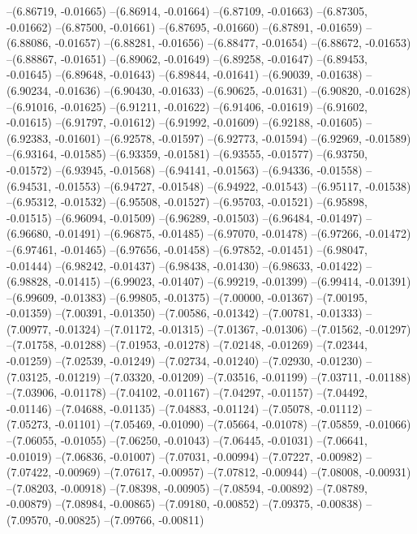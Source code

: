--(6.86719, -0.01665)
--(6.86914, -0.01664)
--(6.87109, -0.01663)
--(6.87305, -0.01662)
--(6.87500, -0.01661)
--(6.87695, -0.01660)
--(6.87891, -0.01659)
--(6.88086, -0.01657)
--(6.88281, -0.01656)
--(6.88477, -0.01654)
--(6.88672, -0.01653)
--(6.88867, -0.01651)
--(6.89062, -0.01649)
--(6.89258, -0.01647)
--(6.89453, -0.01645)
--(6.89648, -0.01643)
--(6.89844, -0.01641)
--(6.90039, -0.01638)
--(6.90234, -0.01636)
--(6.90430, -0.01633)
--(6.90625, -0.01631)
--(6.90820, -0.01628)
--(6.91016, -0.01625)
--(6.91211, -0.01622)
--(6.91406, -0.01619)
--(6.91602, -0.01615)
--(6.91797, -0.01612)
--(6.91992, -0.01609)
--(6.92188, -0.01605)
--(6.92383, -0.01601)
--(6.92578, -0.01597)
--(6.92773, -0.01594)
--(6.92969, -0.01589)
--(6.93164, -0.01585)
--(6.93359, -0.01581)
--(6.93555, -0.01577)
--(6.93750, -0.01572)
--(6.93945, -0.01568)
--(6.94141, -0.01563)
--(6.94336, -0.01558)
--(6.94531, -0.01553)
--(6.94727, -0.01548)
--(6.94922, -0.01543)
--(6.95117, -0.01538)
--(6.95312, -0.01532)
--(6.95508, -0.01527)
--(6.95703, -0.01521)
--(6.95898, -0.01515)
--(6.96094, -0.01509)
--(6.96289, -0.01503)
--(6.96484, -0.01497)
--(6.96680, -0.01491)
--(6.96875, -0.01485)
--(6.97070, -0.01478)
--(6.97266, -0.01472)
--(6.97461, -0.01465)
--(6.97656, -0.01458)
--(6.97852, -0.01451)
--(6.98047, -0.01444)
--(6.98242, -0.01437)
--(6.98438, -0.01430)
--(6.98633, -0.01422)
--(6.98828, -0.01415)
--(6.99023, -0.01407)
--(6.99219, -0.01399)
--(6.99414, -0.01391)
--(6.99609, -0.01383)
--(6.99805, -0.01375)
--(7.00000, -0.01367)
--(7.00195, -0.01359)
--(7.00391, -0.01350)
--(7.00586, -0.01342)
--(7.00781, -0.01333)
--(7.00977, -0.01324)
--(7.01172, -0.01315)
--(7.01367, -0.01306)
--(7.01562, -0.01297)
--(7.01758, -0.01288)
--(7.01953, -0.01278)
--(7.02148, -0.01269)
--(7.02344, -0.01259)
--(7.02539, -0.01249)
--(7.02734, -0.01240)
--(7.02930, -0.01230)
--(7.03125, -0.01219)
--(7.03320, -0.01209)
--(7.03516, -0.01199)
--(7.03711, -0.01188)
--(7.03906, -0.01178)
--(7.04102, -0.01167)
--(7.04297, -0.01157)
--(7.04492, -0.01146)
--(7.04688, -0.01135)
--(7.04883, -0.01124)
--(7.05078, -0.01112)
--(7.05273, -0.01101)
--(7.05469, -0.01090)
--(7.05664, -0.01078)
--(7.05859, -0.01066)
--(7.06055, -0.01055)
--(7.06250, -0.01043)
--(7.06445, -0.01031)
--(7.06641, -0.01019)
--(7.06836, -0.01007)
--(7.07031, -0.00994)
--(7.07227, -0.00982)
--(7.07422, -0.00969)
--(7.07617, -0.00957)
--(7.07812, -0.00944)
--(7.08008, -0.00931)
--(7.08203, -0.00918)
--(7.08398, -0.00905)
--(7.08594, -0.00892)
--(7.08789, -0.00879)
--(7.08984, -0.00865)
--(7.09180, -0.00852)
--(7.09375, -0.00838)
--(7.09570, -0.00825)
--(7.09766, -0.00811)
